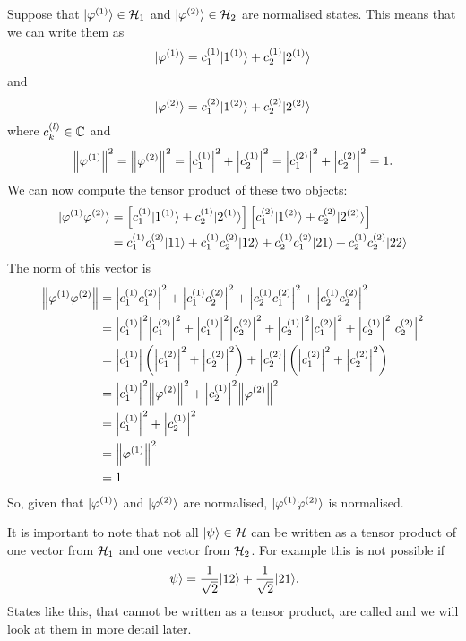     Suppose that \(\vert {\varphi^{(1)}} \rangle\in\mathcal{H}_1\) and \(\vert {\varphi^{(2)}} \rangle\in\mathcal{H}_2\) are normalised states.
    This means that we can write them as
    \[\vert {\varphi^{(1)}} \rangle = c_1^{(1)}\vert {1^{(1)}} \rangle + c_2^{(1)}\vert {2^{(1)}} \rangle\]
    and
    \[\vert {\varphi^{(2)}} \rangle = c_1^{(2)}\vert {1^{(2)}} \rangle + c_2^{(2)}\vert {2^{(2)}} \rangle\]
    where \(c_k^{(l)}\in\mathbb{C}\) and
    \[\norm{\varphi^{(1)}}^2 = \norm{\varphi^{(2)}}^2 = \abs{c_1^{(1)}}^2 + \abs{c_2^{(1)}}^2 = \abs{c_1^{(2)}}^2 + \abs{c_2^{(2)}}^2 = 1.\]
    We can now compute the tensor product of these two objects:
    \begin{align*}
        \vert {\varphi^{(1)}\varphi^{(2)}} \rangle &= \left[c_1^{(1)}\vert {1^{(1)}} \rangle + c_2^{(1)}\vert {2^{(1)}} \rangle\right] \left[c_1^{(2)}\vert {1^{(2)}} \rangle + c_2^{(2)}\vert {2^{(2)}} \rangle\right]\\
        &= c_1^{(1)}c_1^{(2)}\vert {11} \rangle + c_1^{(1)}c_2^{(2)}\vert {12} \rangle + c_2^{(1)}c_1^{(2)}\vert {21} \rangle + c_2^{(1)}c_2^{(2)}\vert {22} \rangle
    \end{align*}
    The norm of this vector is
    \begin{align*}
        \norm{\varphi^{(1)}\varphi^{(2)}} &= \abs{c_1^{(1)}c_1^{(2)}}^2 + \abs{c_1^{(1)}c_2^{(2)}}^2 + \abs{c_2^{(1)}c_1^{(2)}}^2 + \abs{c_2^{(1)}c_2^{(2)}}^2\\
        &= \abs{c_1^{(1)}}^2\abs{c_1^{(2)}}^2 + \abs{c_1^{(1)}}^2\abs{c_2^{(2)}}^2 + \abs{c_2^{(1)}}^2\abs{c_1^{(2)}}^2 + \abs{c_2^{(1)}}^2\abs{c_2^{(2)}}^2\\
        &= \abs{c_1^{(1)}}\left(\abs{c_1^{(2)}}^2 + \abs{c_2^{(2)}}^2\right) + \abs{c_2^{(2)}}\left(\abs{c_1^{(2)}}^2 + \abs{c_2^{(2)}}^2\right)\\
        &= \abs{c_1^{(1)}}^2\norm{\varphi^{(2)}}^2 + \abs{c_2^{{(1)}}}^2\norm{\varphi^{(2)}}^2\\
        &= \abs{c_1^{(1)}}^2 + \abs{c_2^{{(1)}}}^2\\
        &= \norm{\varphi^{(1)}}^2\\
        &= 1
    \end{align*}
    So, given that \(\vert {\varphi^{(1)}} \rangle\) and \(\vert {\varphi^{(2)}} \rangle\) are normalised, \(\vert {\varphi^{(1)}\varphi^{(2)}} \rangle\) is normalised.
    
    It is important to note that not all \(\vert {\psi} \rangle\in\mathcal{H}\) can be written as a tensor product of one vector from \(\mathcal{H}_1\) and one vector from \(\mathcal{H}_2\).
    For example this is not possible if
    \[\vert {\psi} \rangle = \frac{1}{\sqrt{2}}\vert {12} \rangle + \frac{1}{\sqrt{2}}\vert {21} \rangle.\]
    States like this, that cannot be written as a tensor product, are called  and we will look at them in more detail later.
    

